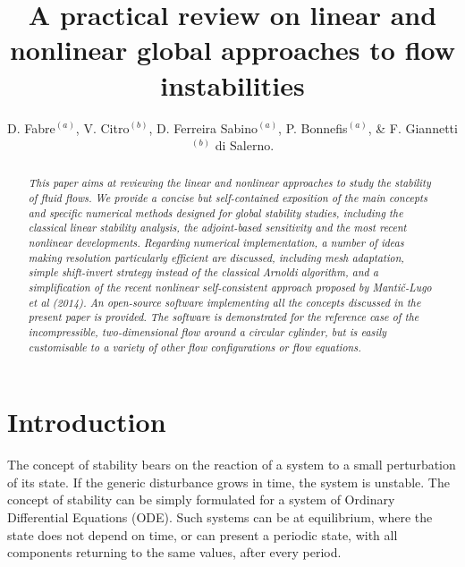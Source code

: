 \documentclass[twocolumn,10pt]{asme2ej}
\title{A practical review on linear and nonlinear global approaches to flow instabilities}
\author{D. Fabre$^{(a)}$,  V. Citro$^{(b)}$,  D. Ferreira Sabino$^{(a)}$, P. Bonnefis$^{(a)}$,  \& F. Giannetti$^{(b)}$
    \affiliation{
	$^{(a)}$ Institut de Mécanique des fluides de Toulouse (IMFT), University of Toulouse \\
	$^{(b)}$ Dipartimento do Ingegneria (DIIN), Universit\`a} di Salerno. 
}
\begin{document}
\lstset{numbers=left, numberstyle=\small, numbersep=8pt, frame = single, language=Matlab, framexleftmargin=15pt}

\maketitle    

\begin{abstract}
{\it 
This paper aims at reviewing the linear and nonlinear approaches to study the stability of fluid flows. 
We provide a concise but self-contained exposition of the main concepts and specific numerical methods 
designed for global stability studies, including the classical linear stability analysis, the adjoint-based sensitivity and  
the most recent nonlinear developments. 
Regarding numerical implementation, a number of ideas making resolution particularly efficient are discussed, 
including mesh adaptation, simple shift-invert strategy instead of the classical Arnoldi algorithm, 
and a simplification of the recent nonlinear self-consistent approach proposed by Manti\v{c}-Lugo et al (2014). 
An open-source software implementing all the concepts discussed in the present paper is provided. 
The software is demonstrated for the reference case of the incompressible, two-dimensional flow around a circular cylinder, but is easily customisable to a variety of other flow configurations or flow equations.
}
\end{abstract}



\section{Introduction}

The concept of stability bears on the reaction of a system to a small perturbation of its state. If the generic disturbance grows in time, the system is unstable. The concept of stability can be simply formulated for a system of Ordinary Differential Equations (ODE). 
Such systems can be at equilibrium, where the state does not depend on time, or can present a periodic state, with all components returning to the same values, after every period. 
\end{document}
